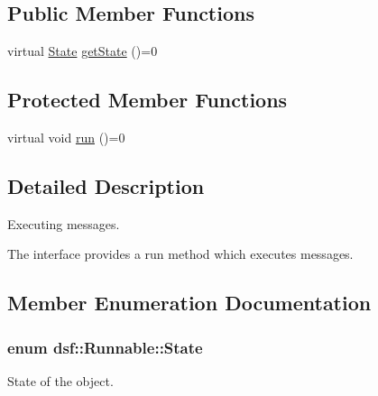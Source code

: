 \subsection*{Public Member Functions}
\begin{DoxyCompactItemize}
\item 
virtual \hyperlink{classdsf_1_1_runnable_a8eb63b21a0accc7a6a2a05f18e257991}{State} \hyperlink{classdsf_1_1_runnable_a139342b0d6d53fc7f1bbd97d99d3724a}{get\+State} ()=0
\end{DoxyCompactItemize}
\subsection*{Protected Member Functions}
\begin{DoxyCompactItemize}
\item 
virtual void \hyperlink{classdsf_1_1_runnable_a6e23b3b551a7cfdbff0e9ba2265d4378}{run} ()=0
\end{DoxyCompactItemize}


\subsection{Detailed Description}
Executing messages. 

The interface provides a run method which executes messages. 

\subsection{Member Enumeration Documentation}
\hypertarget{classdsf_1_1_runnable_a8eb63b21a0accc7a6a2a05f18e257991}{}
\subsubsection[{State}]{\setlength{\rightskip}{0pt plus 5cm}enum {\bf dsf\+::\+Runnable\+::\+State}}\label{classdsf_1_1_runnable_a8eb63b21a0accc7a6a2a05f18e257991}


State of the object. 

